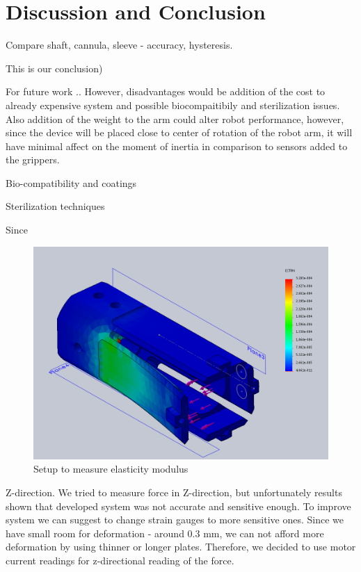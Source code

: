 \chapter{Discussion and Conclusion}
\label{discuss} %

Compare shaft, cannula, sleeve - accuracy, hysteresis.

This is our conclusion)

For future work ..
However, disadvantages would be addition of the cost to already expensive system and possible biocompaitibily and sterilization issues. Also addition of the weight to the arm could alter robot performance, however, since the device will be placed close to center of rotation of the robot arm, it will have minimal affect on the moment of inertia  in comparison to sensors added to the grippers.

Bio-compatibility and coatings

Sterilization techniques

Since 

\begin{figure}[h]
	\begin{center}
		\includegraphics[width=120mm]{fig/methods/NEW_SLEEVE_STRAIN.png}
	\end{center}
	\vspace{-4mm}
	\caption[Setup to measure elasticity modulus]
	{Setup to measure elasticity modulus}
	\label{fig:ElasModSet}
	\vspace{-2mm}
\end{figure}

Z-direction. We tried to measure force in Z-direction, but unfortunately results shown that developed system was not accurate and sensitive enough. To improve system we can suggest to change strain gauges to more sensitive ones. Since we have small room for deformation - around 0.3 mm, we can not afford more deformation by using thinner or longer plates. Therefore, we decided to use motor current readings for z-directional reading of the force.


